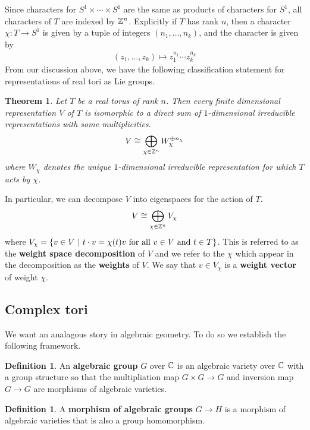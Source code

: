 \documentclass{amsart}
\numberwithin{equation}{section}
\theoremstyle{plain} %
\newtheorem{theorem}[equation]{Theorem}
\theoremstyle{definition}
\newtheorem{definition}[equation]{Definition}
\theoremstyle{remark}
\begin{document}
Since characters for $S^1\times\cdots\times S^1$ are the same as products of characters for $S^1$,
all characters of $T$ are indexed by $\mathbb{Z}^n$. Explicitly if $T$ has rank $n$, then a character $\chi: T\to S^1$ is given by a tuple of integers $(n_1,\ldots, n_k)$, and the character is given by
\begin{align*}
	(z_1,\ldots, z_k)\mapsto z_1^{n_1}\cdots z_k^{n_k}
\end{align*}
From our discussion above, we have the following classification statement for representations of real tori as Lie groups.

\begin{theorem}
	Let $T$ be a real torus of rank $n$. Then every finite dimensional representation $V$ of $T$ is isomorphic
	to a direct sum of $1$-dimensional irreducible representations with some multiplicities.
	\begin{align*}
		V \cong \bigoplus_{\chi\in \mathbb{Z}^n} W_\chi^{\oplus n_\chi}
	\end{align*} where $W_\chi$ denotes the unique $1$-dimensional irreducible representation for which $T$ acts by $\chi$.
\end{theorem}

In particular, we can decompose $V$ into eigenspaces for the action of $T$. \begin{align*}
	V \cong \bigoplus_{\chi\in\mathbb{Z}^n} V_\chi
\end{align*} where $V_\chi = \{v\in V \ \vert \  t\cdot v = \chi(t)v \text{ for all $v\in V$ and $t\in T$}\}$. This is
referred to as the \textbf{weight space decomposition} of $V$ and we refer to the $\chi$ which appear in
the decomposition as the \textbf{weights} of $V$.
We say that $v\in V_\chi$ is a \textbf{weight vector} of weight $\chi$.


\subsection{Complex tori}
We want an analagous story in algebraic geometry. To do so we establish the following framework.
\begin{definition}
	An \textbf{algebraic group} $G$ over $\mathbb{C}$ is an algebraic variety over $\mathbb{C}$ with a group structure
	so that the multipliation map $G\times G\to G$ and inversion map $G\to G$ are morphisms
	of algebraic varieties.
\end{definition}

\begin{definition}
	A \textbf{morphism of algebraic groups} $G\to H$ is a morphism of algebraic varieties that is also a group homomorphism.
\end{definition}
\end{document}
